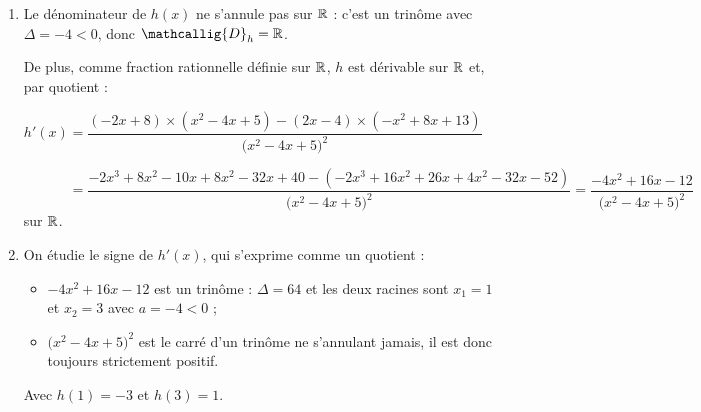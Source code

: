 \documentclass[a4paper,11pt]{article}
\begin{document}
\begin{enumerate}
	\item Le dénominateur de $h(x)$ ne s'annule pas sur $\R$ : c'est un trinôme avec $\Delta=-4<0$, donc $\mathcallig{D}_h=\R$.
	
	De plus, comme fraction rationnelle définie sur $\R$, $h$ est dérivable sur $\R$ et, par quotient :
	
	$h'(x)=\dfrac{(-2x+8) \times (x^2-4x+5)-(2x-4) \times (-x^2+8x+13)}{\big( x^2-4x+5\big)^2}$
	
	$\phantom{h'(x)}=\dfrac{-2x^3+8x^2-10x+8x^2-32x+40-(-2x^3+16x^2+26x+4x^2-32x-52)}{\big( x^2-4x+5\big)^2}=\dfrac{-4x^2+16x-12}{\big( x^2-4x+5\big)^2}$ sur $\R$.
	\item On étudie le signe de $h'(x)$, qui s'exprime comme un quotient :
	\begin{itemize}
		\item $-4x^2+16x-12$ est un trinôme : $\Delta=64$ et les deux racines sont $x_1=1$ et $x_2=3$ avec $a=-4<0$ ;
		\item $\big( x^2-4x+5\big)^2$ est le carré d'un trinôme ne s'annulant jamais, il est donc toujours strictement positif.
	\end{itemize}
	\begin{center}
		
		Avec $h(1)=-3$ et $h(3)=1$.
	\end{center}
\end{enumerate}

\medskip

\end{document}
